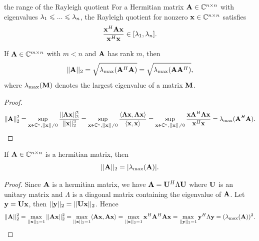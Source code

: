 \begin{proposition}{}{the range of the Rayleigh quotient}
    For a Hermitian matrix $\bold{A}\in \mathbb{C}^{n\times n}$ with eigenvalues $\lambda_1\leqslant ...\leqslant \lambda_n$,
    the Rayleigh quotient for nonzero $\bold{x}\in \mathbb{C}^{n\times n}$ satisfies
    \begin{align*}
        \frac{\bold{x}^H\bold{A}\bold{x}}{\bold{x}^H\bold{x}}\in [\lambda_1,\lambda_n].
    \end{align*}
\end{proposition}

\begin{proposition}{}{}
    If $\bold{A}\in \mathbb{C}^{m\times n}$ with $m<n$ and $\bold{A}$ has rank $m$, then 
    \begin{align*}
        ||\bold{A}||_2=\sqrt{\lambda_{\max}(\bold{A}^H\bold{A})}=\sqrt{\lambda_{\max}(\bold{A}\bold{A}^H)},
    \end{align*}
    where $\lambda_{\max}(\bold{M})$ denotes the largest eigenvalue of a matrix $\bold{M}$.
\end{proposition}

\begin{proof}
    \begin{align*}
        ||\bold{A}||_2^2=\sup_{\bold{x}\in\mathbb{C}^n,||\bold{x}||\neq 0} \frac{||\bold{Ax}||_2^2}{||\bold{x}||_2^2}
        =\sup_{\bold{x}\in\mathbb{C}^n,||\bold{x}||\neq 0}\frac{\langle\bold{Ax},\bold{Ax}\rangle}{\langle\bold{x},\bold{x}\rangle}
        =\sup_{\bold{x}\in\mathbb{C}^n,||\bold{x}||\neq 0}\frac{\bold{x}\bold{A}^H\bold{A}\bold{x}}{\bold{x}^H\bold{x}}
        =\lambda_{\text{max}}(\bold{A}^H\bold{A}).
    \end{align*}
\end{proof}

\begin{proposition}{}{}
    If $\bold{A}\in \mathbb{C}^{n\times n}$ is a hermitian matrix, then 
    \begin{align*}
        ||\bold{A}||_2= |\lambda_{\max}(\bold{A})|.
    \end{align*}
\end{proposition}

\begin{proof}
    Since $\bold{A}$ is a hermitian matrix, we have $\bold{A}=\bold{U}^H\Lambda \bold{U}$ where $\bold{U}$ is an unitary matrix and $\Lambda$ is a diagonal matrix containing the eigenvalue of $\bold{A}$.
    Let $\bold{y}=\bold{Ux}$, then $||\bold{y}||_2=||\bold{Ux}||_2$. Hence 
    \begin{align*}
        ||\bold{A}||_2^2=\max_{||\bold{x}||_2=1} ||\bold{Ax}||_2^2 = \max_{||\bold{x}||_2=1} \langle\bold{Ax},\bold{Ax}\rangle
        = \max_{||\bold{x}||_2=1} \bold{x}^H\bold{A}^H\bold{A}\bold{x} =\max_{||\bold{y}||_2=1} \bold{y}^H\Lambda\bold{y}=(\lambda_{\max}(\bold{A}))^2.
    \end{align*}
\end{proof}


